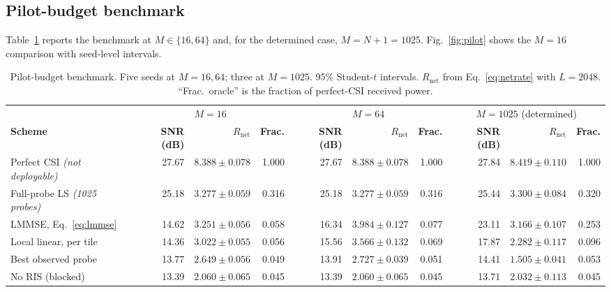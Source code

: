 \documentclass[journal]{IEEEtran}
\begin{document}
\subsection{Pilot-budget benchmark}
Table~\ref{tab:pilot} reports the benchmark at $M\in\{16,64\}$ and, for the determined case, $M=N+1=1025$. Fig.~\ref{fig:pilot} shows the $M=16$ comparison with seed-level intervals.

\begin{table}[!t]
\centering
\caption{Pilot-budget benchmark. Five seeds at $M=16,64$; three at $M=1025$. 95\% Student-$t$ intervals. $R_{\mathrm{net}}$ from Eq.~\eqref{eq:netrate} with $L=2048$. ``Frac.\ oracle'' is the fraction of perfect-CSI received power.}
\label{tab:pilot}
\renewcommand{\arraystretch}{1.15}
\setlength{\tabcolsep}{5pt}
\footnotesize
\begin{tabular}{@{}lrrrrrrrrr@{}}
\toprule
& \multicolumn{3}{c}{$M=16$} & \multicolumn{3}{c}{$M=64$} & \multicolumn{3}{c}{$M=1025$ (determined)} \\
\cmidrule(lr){2-4}\cmidrule(lr){5-7}\cmidrule(lr){8-10}
\textbf{Scheme} & \textbf{SNR (dB)} & \textbf{$R_{\mathrm{net}}$} & \textbf{Frac.} & \textbf{SNR (dB)} & \textbf{$R_{\mathrm{net}}$} & \textbf{Frac.} & \textbf{SNR (dB)} & \textbf{$R_{\mathrm{net}}$} & \textbf{Frac.} \\
\midrule
Perfect CSI \emph{(not deployable)} & 27.67 & $8.388\pm0.078$ & 1.000 & 27.67 & $8.388\pm0.078$ & 1.000 & 27.84 & $8.419\pm0.110$ & 1.000 \\
\midrule
Full-probe LS \emph{(1025 probes)} & 25.18 & $3.277\pm0.059$ & 0.316 & 25.18 & $3.277\pm0.059$ & 0.316 & 25.44 & $3.300\pm0.084$ & 0.320 \\
LMMSE, Eq.~\eqref{eq:lmmse}        & 14.62 & $\bm{3.251\pm0.056}$ & 0.058 & 16.34 & $\bm{3.984\pm0.127}$ & 0.077 & 23.11 & $3.166\pm0.107$ & 0.253 \\
Local linear, per tile             & 14.36 & $3.022\pm0.055$ & 0.056 & 15.56 & $3.566\pm0.132$ & 0.069 & 17.87 & $2.282\pm0.117$ & 0.096 \\
Best observed probe                & 13.77 & $2.649\pm0.056$ & 0.049 & 13.91 & $2.727\pm0.039$ & 0.051 & 14.41 & $1.505\pm0.041$ & 0.053 \\
\midrule
No RIS (blocked)                   & 13.39 & $2.060\pm0.065$ & 0.045 & 13.39 & $2.060\pm0.065$ & 0.045 & 13.71 & $2.032\pm0.113$ & 0.045 \\
\bottomrule
\end{tabular}
\end{table}
\end{document}
